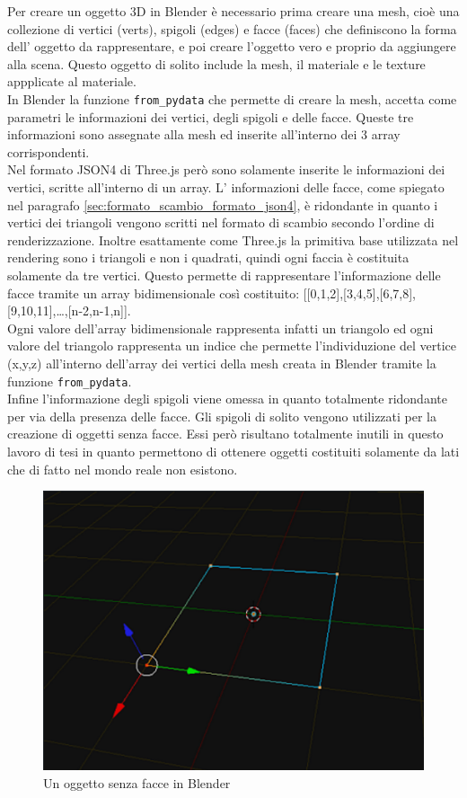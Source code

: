 Per creare un oggetto 3D in Blender è necessario prima creare una mesh, cioè una collezione di vertici (verts), spigoli (edges) e facce (faces) che definiscono la forma dell’ oggetto da rappresentare, e poi creare l’oggetto vero e proprio da aggiungere alla scena. Questo oggetto di solito include la mesh, il materiale e le texture appplicate al materiale.
\\
In Blender la funzione \texttt{from\_pydata} che permette di creare la mesh, accetta come parametri le informazioni dei vertici, degli spigoli e delle facce. Queste tre informazioni sono assegnate alla mesh ed inserite all’interno dei 3 array corrispondenti.
\\
Nel formato JSON4 di Three.js però sono solamente inserite le informazioni dei vertici, scritte all’interno di un array. L’ informazioni delle facce, come spiegato nel paragrafo \ref{sec:formato_scambio_formato_json4}, è ridondante in quanto i vertici dei triangoli vengono scritti nel formato di scambio secondo l’ordine di renderizzazione. Inoltre esattamente come Three.js la primitiva base utilizzata nel rendering sono i triangoli e non i quadrati, quindi ogni faccia è costituita solamente da tre vertici. 
Questo permette di rappresentare l’informazione delle facce tramite un array bidimensionale così costituito: [[0,1,2],[3,4,5],[6,7,8],[9,10,11],…,[n-2,n-1,n]].
\\
Ogni valore dell’array bidimensionale rappresenta infatti un triangolo ed ogni valore del triangolo rappresenta un indice che permette l’individuzione del vertice (x,y,z) all’interno dell’array dei vertici della mesh creata in Blender tramite la funzione \texttt{from\_pydata}.
\\
Infine l’informazione degli spigoli viene omessa in quanto totalmente ridondante per via della presenza delle facce. 
Gli spigoli di solito vengono utilizzati per la creazione di oggetti senza facce. Essi però risultano totalmente inutili in questo lavoro di tesi in quanto permettono di ottenere oggetti costituiti solamente da lati che di fatto nel mondo reale non esistono.
\\
\begin{figure}[htb]
 \centering
 \includegraphics[width=0.6\linewidth]{images/chapter_baking_service/Blender_spigoli.png}\hfill
 \caption[Blender e gli spigoli]{Un oggetto senza facce in Blender}
 \label{fig:baking_service_Blender_spigoli}
\end{figure}


